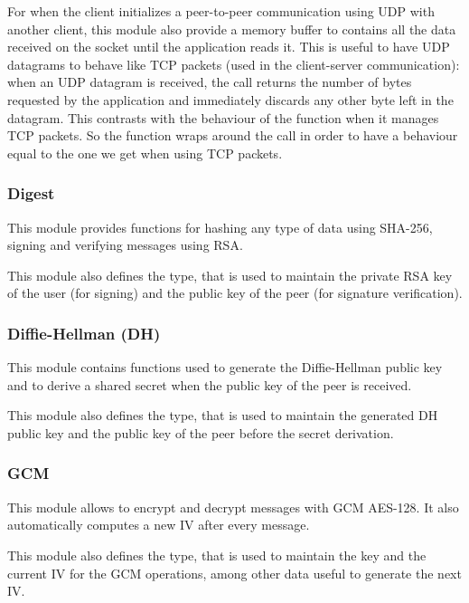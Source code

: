 For when the client initializes a peer-to-peer communication using UDP with
another client, this module also provide a memory buffer to contains all the
data received on the socket until the application reads it. This is useful to
have UDP datagrams to behave like TCP packets (used in the client-server
communication): when an UDP datagram is received, the  call
returns the number of bytes requested by the application and immediately
discards any other byte left in the datagram. This contrasts with the behaviour
of the  function when it manages TCP packets. So the
 function wraps around the  call in order
to have a behaviour equal to the one we get when using TCP packets.

\subsubsection{Digest}

This module provides functions for hashing any type of data using SHA-256,
signing and verifying messages using RSA\@.

This module also defines the  type, that is used to maintain
the private RSA key of the user (for signing) and the public key of the peer
(for signature verification).

\subsubsection{Diffie-Hellman (DH)}

This module contains functions used to generate the Diffie-Hellman public key
and to derive a shared secret when the public key of the peer is received.

This module also defines the  type, that is used to maintain the
generated DH public key and the public key of the peer before the secret
derivation.

\subsubsection{GCM}

This module allows to encrypt and decrypt messages with GCM AES-128. It also
automatically computes a new IV after every message.

This module also defines the  type, that is used to maintain the
key and the current IV for the GCM operations, among other data useful to
generate the next IV\@.

